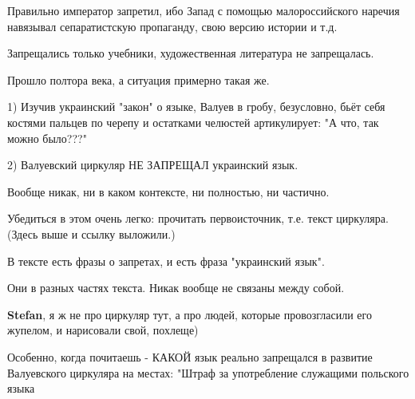 \begin{itemize}
 

Правильно император запретил, ибо Запад с помощью малороссийского наречия
навязывал сепаратистскую пропаганду, свою версию истории и т.д.

Запрещались только учебники, художественная литература не запрещалась.

Прошло полтора века, а ситуация примерно такая же.

 

1) Изучив украинский "закон" о языке, Валуев в гробу, безусловно, бьёт себя
костями пальцев по черепу и остатками челюстей артикулирует: "А что, так можно
было???"

2) Валуевский циркуляр НЕ ЗАПРЕЩАЛ украинский язык.

Вообще никак, ни в каком контексте, ни полностью, ни частично.

Убедиться в этом очень легко: прочитать первоисточник, т.е. текст циркуляра.
(Здесь выше и ссылку выложили.)

В тексте есть фразы о запретах, и есть фраза "украинский язык".

Они в разных частях текста. Никак вообще не связаны между собой.

\begin{itemize}
 
\textbf{Stefan}, я ж не про циркуляр тут, а про людей, которые провозгласили его жупелом, и нарисовали свой, похлеще)

 

Особенно, когда почитаешь - КАКОЙ язык реально запрещался в развитие
Валуевского циркуляра на местах: "Штраф за употребление служащими польского
языка


\end{itemize}
\end{itemize}
